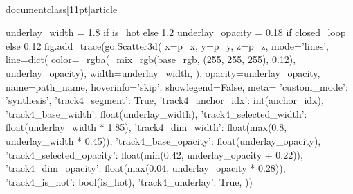 \\documentclass[11pt]{article}
\begin{document}
\begin{CodeBlock}
{{{{{{                    underlay_width = 1.8 if is_hot else 1.2
                    underlay_opacity = 0.18 if closed_loop else 0.12
                    fig.add_trace(go.Scatter3d(
                        x=p_x, y=p_y, z=p_z,
                        mode='lines',
                        line=dict(
                            color=_rgba(_mix_rgb(base_rgb, (255, 255, 255), 0.12), underlay_opacity),
                            width=underlay_width,
                        ),
                        opacity=underlay_opacity,
                        name=path_name,
                        hoverinfo='skip',
                        showlegend=False,
                        meta={
                            'custom_mode': 'synthesis',
                            'track4_segment': True,
                            'track4_anchor_idx': int(anchor_idx),
                            'track4_base_width': float(underlay_width),
                            'track4_selected_width': float(underlay_width * 1.85),
                            'track4_dim_width': float(max(0.8, underlay_width * 0.45)),
                            'track4_base_opacity': float(underlay_opacity),
                            'track4_selected_opacity': float(min(0.42, underlay_opacity + 0.22)),
                            'track4_dim_opacity': float(max(0.04, underlay_opacity * 0.28)),
                            'track4_is_hot': bool(is_hot),
                            'track4_underlay': True,
                        }
                    ))

}}}}}}
\end{CodeBlock}
\end{document}
